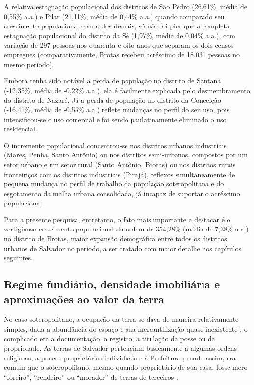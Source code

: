 A relativa estagnação populacional dos distritos de São Pedro (26,61\%, média de 0,55\% a.a.) e Pilar (21,11\%, média de 0,44\% a.a.) quando comparado seu crescimento populacional com o dos demais, só não foi pior que a completa estagnação populacional do distrito da Sé (1,97\%, média de 0,04\% a.a.), com variação de 297 pessoas nos quarenta e oito anos que separam os dois censos empregues (comparativamente, Brotas recebeu acréscimo de 18.031 pessoas no mesmo período).

Embora tenha sido notável a perda de população no distrito de Santana (-12,35\%, média de -0,22\% a.a.), ela é facilmente explicada pelo desmembramento do distrito de Nazaré. Já a perda de população no distrito da Conceição (-16,41\%, média de -0,55\% a.a.) reflete mudanças no perfil do seu uso, pois intensificou-se o uso comercial e foi sendo paulatinamente eliminado o uso residencial.

O incremento populacional concentrou-se nos distritos urbanos industriais (Mares, Penha, Santo Antônio) ou nos distritos semi-urbanos, compostos por um setor urbano e um setor rural (Santo Antônio, Brotas) ou nos distritos rurais fronteiriços com os distritos industriais (Pirajá), reflexos simultaneamente de pequena mudança no perfil de trabalho da população soteropolitana e do esgotamento da malha urbana consolidada, já incapaz de suportar o acréscimo populacional.

Para a presente pesquisa, entretanto, o fato mais importante a destacar é o vertiginoso crescimento populacional da ordem de 354,28\% (média de 7,38\% a.a.) no distrito de Brotas, maior expansão demográfica entre todos os distritos urbanos de Salvador no período, a ser tratado com maior detalhe nos capítulos seguintes.

\subsection{Regime fundiário, densidade imobiliária e aproximações ao valor da terra}\label{subsubsec:polfundvalter}

No caso soteropolitano, a ocupação da terra se dava de maneira relativamente simples, dada a abundância do espaço e sua mercantilização quase inexistente \cite[p.~25]{MOURA1990}; o complicado era a documentação, o registro, a titulação da posse ou da propriedade. As terras de Salvador pertenciam basicamente a algumas ordens religiosas, a poucos proprietários individuais e à Prefeitura \cite{CEDURB1978}; sendo assim, era comum que o soteropolitano, mesmo quando proprietário de sua casa, fosse mero ``foreiro'', ``rendeiro'' ou ``morador'' de terras de terceiros \cite[p.~139]{BRANDAO1980}. 

